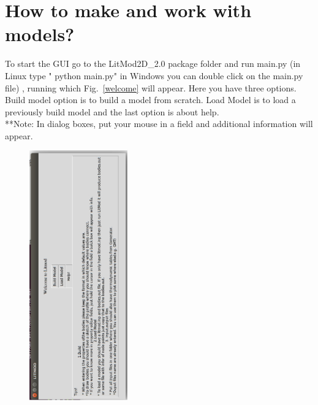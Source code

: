 \documentclass[14pt]{article}
\begin{document}
\vspace{50pt}
\section{How to make and work with models?}
To start the GUI go to the LitMod2D\_2.0 package folder and run main.py (in Linux type " python main.py" in Windows you can double click on the main.py file) , running which Fig.~\ref{welcome} will appear. Here you have three options. Build model option is to build a model from scratch. Load Model is to load a previously build model and the last option is about help.\\
**Note: In dialog boxes, put your mouse in a field and additional information will appear. 
\begin{figure}
\centering \includegraphics[width=10pc,angle=-90]{./welcome.eps}

\end{figure}
\end{document}
